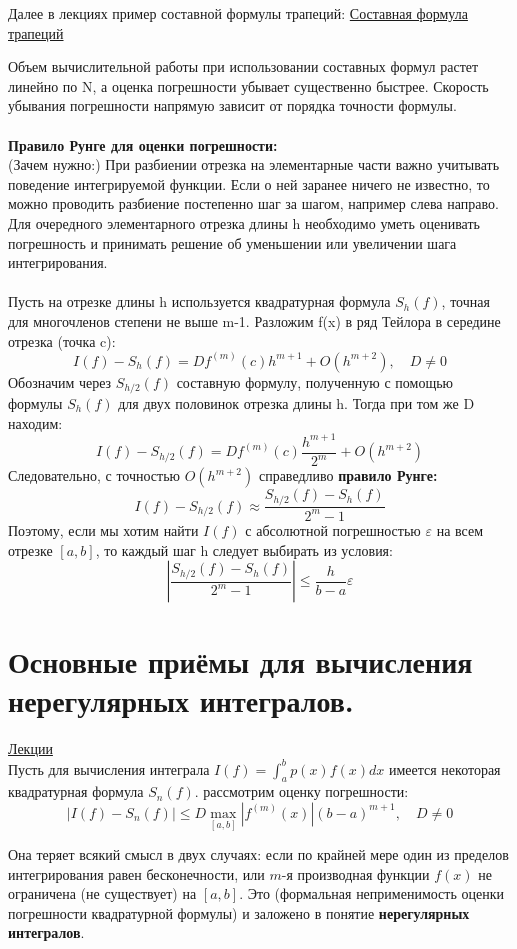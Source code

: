 \documentclass[specialist, subf, href, colorlinks=true, 12pt, times, mtpro, final]{disser}
\theoremstyle{definition}
\begin{document}
     Далее в лекциях пример составной формулы трапеций: \hyperlink {lects.44}{Составная формула трапеций}
     
     Объем вычислительной работы при использовании составных формул растет линейно по N, а оценка погрешности убывает существенно быстрее. Скорость убывания погрешности напрямую зависит от порядка точности формулы.
     \\ \\ 
     \textbf{Правило Рунге для оценки погрешности:}\\
     (Зачем нужно:) При разбиении отрезка на элементарные части важно учитывать поведение интегрируемой функции. Если о ней заранее ничего не известно, то можно проводить разбиение постепенно шаг за шагом, например слева направо. Для очередного элементарного отрезка длины h необходимо уметь оценивать погрешность и принимать решение об уменьшении или увеличении шага интегрирования. 
     \\ \\
     Пусть на отрезке длины h используется квадратурная формула $S_h(f)$, точная для многочленов степени не выше m-1. Разложим f(x) в ряд Тейлора в середине отрезка (точка c):
     $$I(f) - S_h(f) = Df^{(m)}(c)h^{m+1} + O(h^{m+2}), \quad D \not= 0$$ 
     Обозначим через $S_{h/2}(f)$ составную формулу, полученную с помощью формулы $S_h(f)$ для двух половинок отрезка длины h. Тогда при том же D находим:
     $$I(f) - S_{h/2}(f) = Df^{(m)}(c) \frac{h^{m+1}}{2^m} + O(h^{m+2})$$
     Следовательно, с точностью $O(h^{m+2})$ справедливо \textbf{правило Рунге:}
     $$\boxed {I(f) - S_{h/2}(f) \approx \frac{S_{h/2}(f) - S_h(f)}{2^m - 1}}$$
     Поэтому, если мы хотим найти $I(f)$ с абсолютной погрешностью $\varepsilon$ на всем отрезке $[a, b]$, то каждый шаг h следует выбирать из условия:
     $$\left|\frac{S_{h/2}(f) - S_h(f)}{2^m - 1}\right| \leq \frac{h}{b-a}\varepsilon$$

\section {Основные приёмы для вычисления нерегулярных интегралов.}
    \hyperlink {lects.45}{Лекции}\\
    Пусть для вычисления интеграла $I(f) = \int_a^b p(x)f(x)dx$ имеется некоторая квадратурная формула $S_n(f)$. рассмотрим оценку погрешности:
    $$|I(f) - S_n(f)| \leq D \max\limits_{[a, b]}|f^{(m)}(x)|(b-a)^{m+1}, \quad D \not = 0$$

    Она теряет всякий смысл в двух случаях: если по крайней мере один из пределов интегрирования равен бесконечности, или $m$-я производная функции $f(x)$ не ограничена (не существует) на $[a, b]$. Это (формальная неприменимость оценки погрешности квадратурной формулы) и заложено в понятие \textbf{нерегулярных интегралов}. 
    
\end{document}

